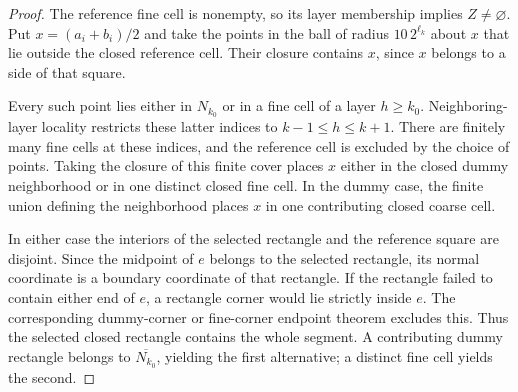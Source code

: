 \begin{proof}\leanok
    The reference fine cell is nonempty, so its layer
    membership implies $Z\ne\varnothing$. Put $x=(a_i+b_i)/2$ and
    take the points in the ball of radius $10\,2^{\ell_k}$ about
    $x$ that lie outside the closed reference cell. Their closure
    contains $x$, since $x$ belongs to a side of that square.

    Every such point lies either in $N_{k_0}$ or in a
    fine cell of a layer $h\ge k_0$. Neighboring-layer locality
    restricts these latter indices to $k-1\le h\le k+1$.
    There are finitely many fine cells at these indices, and the
    reference cell is excluded by the choice of points. Taking
    the closure of this finite cover places $x$ either in the
    closed dummy neighborhood or in one distinct closed fine cell.
    In the dummy case, the finite union defining the neighborhood
    places $x$ in one contributing closed coarse cell.

    In either case the interiors of the selected rectangle and
    the reference square are disjoint. Since the midpoint of $e$
    belongs to the selected rectangle, its normal coordinate is
    a boundary coordinate of that rectangle. If the rectangle
    failed to contain either end of $e$, a rectangle corner
    would lie strictly inside $e$. The corresponding dummy-corner
    or fine-corner endpoint theorem excludes this.
    Thus the selected closed rectangle contains the whole segment.
    A contributing dummy rectangle belongs to $\overline{N_{k_0}}$,
    yielding the first alternative; a distinct fine cell
    yields the second.
\end{proof}
